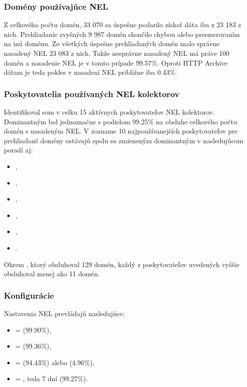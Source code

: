 \subsubsection{Domény používajúce NEL}

Z celkového počtu domén, 33 070 sa úspešne podarilo získať dáta iba z 23 183 z nich.
Prehliadanie zvyšných 9 987 domén skončilo chybou alebo presmerovaním na inú doménu. 
Zo všetkých úspešne prehliadaných domén malo správne nasadený NEL 23 083 z nich.
Takže nesprávne nasadený NEL má práve 100 domén a nasadenie NEL je v tomto prípade 99.57\%.
Oproti HTTP Archive dátam je teda pokles v nasadení NEL približne iba 0.43\%.

\subsubsection{Poskytovatelia používaných NEL kolektorov}

Identifikoval som v celku 15 aktívnych poskytovateľov NEL kolektorov.
Dominantným bol jednoznačne  s podielom 99.25\% na obsluhe celkového počtu domén s nasadeným NEL.
V zozname 10 najpoužívanejších poskytovateľov pre prehliadané domény ostávajú spolu so zmieneným dominantným v nasledujúcom poradí aj:
\begin{itemize}
    \item {},
    \item {},
    \item {},
    \item {},
    \item {},
    \item {}.
\end{itemize}
Okrem , ktorý obsluhoval 129 domén, každý z poskytovateľov uvedených vyššie obsluhoval menej ako 11 domén.


\subsubsection{Konfigurácie}

Nastavenia NEL prevládajú nasledujúce:
\begin{itemize}
    \item {} =  (99.90\%),
    \item {} =  (99.36\%),
    \item {} =  (94.43\%) alebo  (4.96\%),
    \item {} = , teda 7 dní (99.27\%).
\end{itemize}

